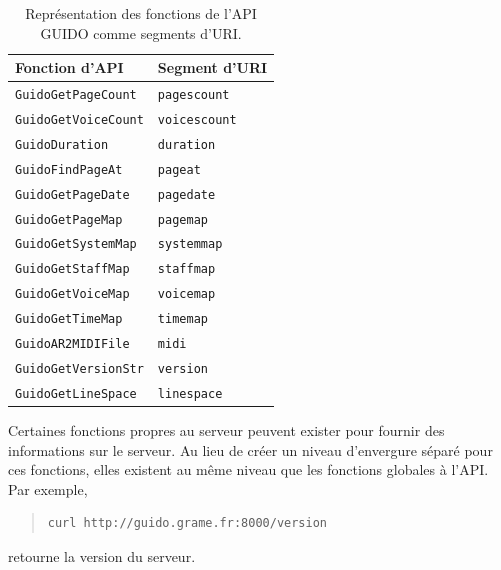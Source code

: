 \documentclass{article}
\newcommand{\guidosize}{7pt}
\begin{document}
\begin{table}
\begin{tabular}{|l|l|}\hline
Fonction d'API & Segment d'URI \\\hline\hline
\verb=GuidoGetPageCount= & \verb=pagescount= \\\hline
\verb=GuidoGetVoiceCount= & \verb=voicescount= \\\hline
\verb=GuidoDuration= & \verb=duration= \\\hline
\verb=GuidoFindPageAt= & \verb=pageat= \\\hline
\verb=GuidoGetPageDate= & \verb=pagedate= \\\hline
\verb=GuidoGetPageMap= & \verb=pagemap= \\\hline
\verb=GuidoGetSystemMap= & \verb=systemmap= \\\hline
\verb=GuidoGetStaffMap= & \verb=staffmap= \\\hline
\verb=GuidoGetVoiceMap= & \verb=voicemap= \\\hline
\verb=GuidoGetTimeMap= & \verb=timemap= \\\hline
\verb=GuidoAR2MIDIFile= & \verb=midi= \\\hline
\verb=GuidoGetVersionStr= & \verb=version= \\\hline
\verb=GuidoGetLineSpace= & \verb=linespace= \\\hline
\end{tabular}
\cprotect\caption{\label{table:table1} Représentation des fonctions de l'API GUIDO comme segments d'URI.}
\end{table}
Certaines fonctions propres au serveur peuvent exister pour fournir des informations sur le serveur. Au lieu de créer un niveau d'envergure séparé pour ces fonctions, elles existent au même niveau que les fonctions globales à l'API. Par exemple, 
\begin{quote}
\begingroup
\fontsize{\guidosize}{12pt}\selectfont
\begin{verbatim}
curl http://guido.grame.fr:8000/version
\end{verbatim}
\endgroup
\end{quote}
retourne la version du serveur.
\end{document}
